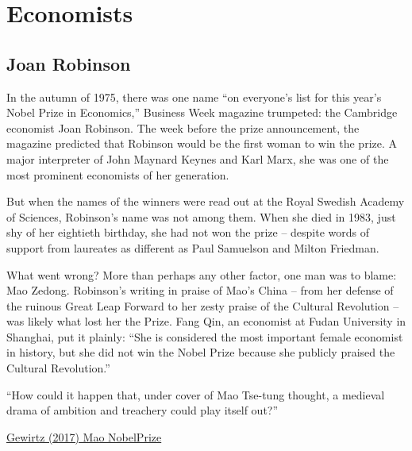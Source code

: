 \documentclass[
]{book}
\begin{document}
\hypertarget{economists}{%
\chapter{Economists}\label{economists}}

\hypertarget{joan-robinson}{%
\section{Joan Robinson}\label{joan-robinson}}

In the autumn of 1975, there was one name ``on everyone's list for this year's Nobel Prize in Economics,'' Business Week magazine trumpeted: the Cambridge economist Joan Robinson. The week before the prize announcement, the magazine predicted that Robinson would be the first woman to win the prize. A major interpreter of John Maynard Keynes and Karl Marx, she was one of the most prominent economists of her generation.

But when the names of the winners were read out at the Royal Swedish Academy of Sciences, Robinson's name was not among them. When she died in 1983, just shy of her eightieth birthday, she had not won the prize -- despite words of support from laureates as different as Paul Samuelson and Milton Friedman.

What went wrong? More than perhaps any other factor, one man was to blame: Mao Zedong. Robinson's writing in praise of Mao's China -- from her defense of the ruinous Great Leap Forward to her zesty praise of the Cultural Revolution -- was likely what lost her the Prize. Fang Qin, an economist at Fudan University in Shanghai, put it plainly: ``She is considered the most important female economist in history, but she did not win the Nobel Prize because she publicly praised the Cultural Revolution.''

``How could it happen that, under cover of Mao Tse-tung thought, a medieval drama of ambition and treachery could play itself out?''

\href{https://chinachannel.org/2017/12/13/fellow-travellers-tale/}{Gewirtz (2017) Mao NobelPrize}
\end{document}
